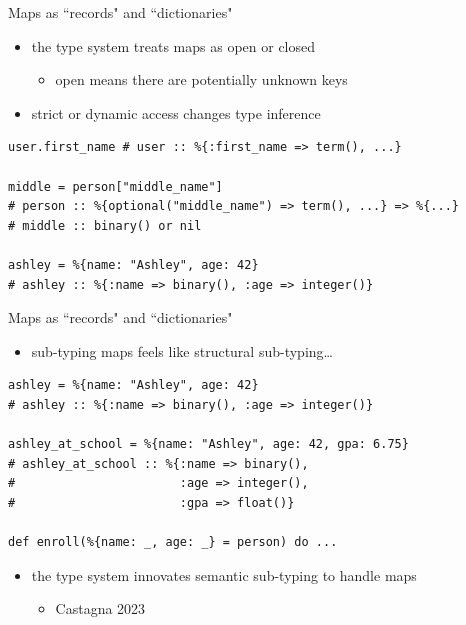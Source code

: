 \documentclass[
  ignorenonframetext,
  aspectratio=169]{beamer}
\providecommand{\tightlist}{%
  \setlength{\itemsep}{0pt}\setlength{\parskip}{0pt}}
\begin{document}
\begin{frame}[fragile]{Maps as ``records" and ``dictionaries"}
\label{maps-as-records-and-dictionaries-1}
\begin{itemize}
\tightlist
\item
  the type system treats maps as open or closed

  \begin{itemize}
  \tightlist
  \item
    open means there are potentially unknown keys
  \end{itemize}
\item
  strict or dynamic access changes type inference
\end{itemize}

\begin{lstlisting}
user.first_name # user :: %{:first_name => term(), ...}

middle = person["middle_name"]
# person :: %{optional("middle_name") => term(), ...} => %{...}
# middle :: binary() or nil

ashley = %{name: "Ashley", age: 42}
# ashley :: %{:name => binary(), :age => integer()}
\end{lstlisting}
\end{frame}

\begin{frame}[fragile]{Maps as ``records" and ``dictionaries"}
\label{maps-as-records-and-dictionaries-2}
\begin{itemize}
\tightlist
\item
  sub-typing maps feels like structural sub-typing\ldots{}
\end{itemize}

\begin{lstlisting}
ashley = %{name: "Ashley", age: 42}
# ashley :: %{:name => binary(), :age => integer()}

ashley_at_school = %{name: "Ashley", age: 42, gpa: 6.75}
# ashley_at_school :: %{:name => binary(),
#                       :age => integer(),
#                       :gpa => float()}

def enroll(%{name: _, age: _} = person) do ...
\end{lstlisting}

\begin{itemize}
\tightlist
\item
  the type system innovates semantic sub-typing to handle maps

  \begin{itemize}
  \tightlist
  \item
    Castagna 2023
  \end{itemize}
\end{itemize}
\end{frame}
\end{document}
